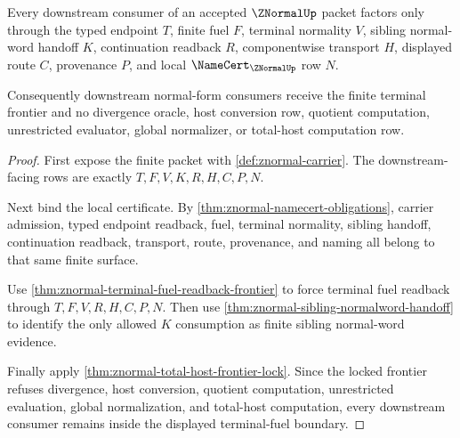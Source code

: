 \begin{theorem}
\label{thm:znormal-downstream-consumer-boundary}
Every downstream consumer of an accepted $\ZNormalUp$ packet factors only
through the typed endpoint $T$, finite fuel $F$, terminal normality $V$,
sibling normal-word handoff $K$, continuation readback $R$, componentwise
transport $H$, displayed route $C$, provenance $P$, and local
$\NameCert_{\ZNormalUp}$ row $N$.

Consequently downstream normal-form consumers receive the finite terminal
frontier and no divergence oracle, host conversion row, quotient computation,
unrestricted evaluator, global normalizer, or total-host computation row.
\end{theorem}
\begin{proof}
First expose the finite packet with \autoref{def:znormal-carrier}. The
downstream-facing rows are exactly $T,F,V,K,R,H,C,P,N$.

Next bind the local certificate. By
\autoref{thm:znormal-namecert-obligations}, carrier admission, typed endpoint
readback, fuel, terminal normality, sibling handoff, continuation readback,
transport, route, provenance, and naming all belong to that same finite
surface.

Use \autoref{thm:znormal-terminal-fuel-readback-frontier} to force terminal
fuel readback through $T,F,V,R,H,C,P,N$. Then use
\autoref{thm:znormal-sibling-normalword-handoff} to identify the only allowed
$K$ consumption as finite sibling normal-word evidence.

Finally apply \autoref{thm:znormal-total-host-frontier-lock}. Since the locked
frontier refuses divergence, host conversion, quotient computation,
unrestricted evaluation, global normalization, and total-host computation,
every downstream consumer remains inside the displayed terminal-fuel boundary.
\end{proof}

